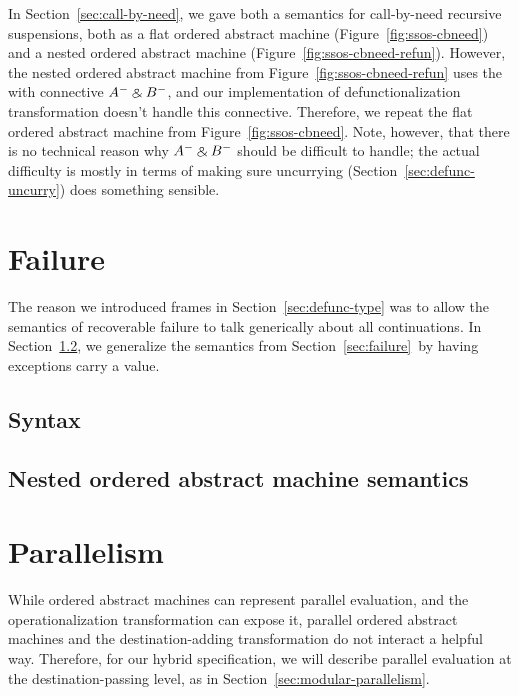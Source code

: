 In Section~\ref{sec:call-by-need}, we gave both a semantics for
call-by-need recursive suspensions, both as a flat ordered abstract
machine (Figure~\ref{fig:ssos-cbneed}) and a nested ordered abstract
machine (Figure~\ref{fig:ssos-cbneed-refun}). However, the nested
ordered abstract machine from Figure~\ref{fig:ssos-cbneed-refun} uses
the with connective $A^- \mathbin{\binampersand} B^-$, and our implementation of
defunctionalization transformation doesn't handle this connective.
Therefore, we repeat the flat ordered abstract machine from
Figure~\ref{fig:ssos-cbneed}.  Note, however, that there is no
technical reason why $A^- \mathbin{\binampersand} B^-$ should be difficult to handle;
the actual difficulty is mostly in terms of making sure uncurrying
(Section~\ref{sec:defunc-uncurry}) does something sensible.

\bigskip
{}

\section{Failure}

The reason we introduced frames in Section~\ref{sec:defunc-type} was
to allow the semantics of recoverable failure to talk generically
about all continuations. In Section~\ref{sec:compose-control}, we
generalize the semantics from Section~\ref{sec:failure}~by having exceptions
carry a value.

\subsection{Syntax}


\subsection{Nested ordered abstract machine semantics}
\label{sec:compose-control}


\section{Parallelism}

While ordered abstract machines can represent parallel evaluation, and
the operationalization transformation can expose it, parallel ordered
abstract machines and the destination-adding transformation do not
interact a helpful way. Therefore, for our hybrid specification,
we will describe parallel evaluation at the destination-passing 
level, as in Section~\ref{sec:modular-parallelism}.

